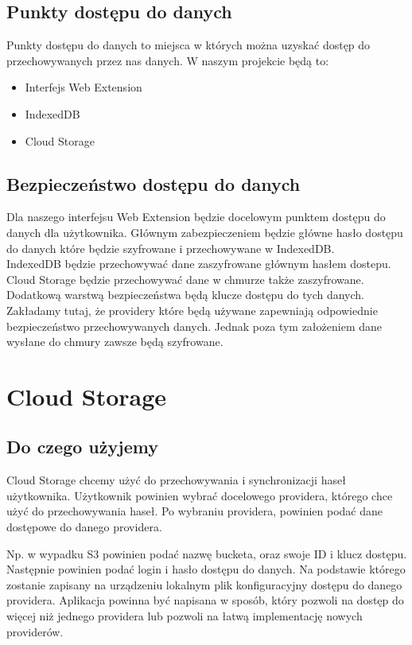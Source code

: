 \documentclass[11pt, a4paper]{article}
\begin{document}
\subsection{Punkty dostępu do danych}
Punkty dostępu do danych to miejsca w których można uzyskać dostęp do przechowywanych przez nas danych.
W naszym projekcie będą to:
\begin{itemize}
    \item Interfejs Web Extension
    \item IndexedDB
    \item Cloud Storage
\end{itemize}

\subsection{Bezpieczeństwo dostępu do danych}

Dla naszego interfejsu Web Extension będzie docelowym punktem dostępu do danych dla użytkownika. 
Głównym zabezpieczeniem będzie główne hasło dostępu do danych które będzie szyfrowane i przechowywane w IndexedDB.\\
IndexedDB będzie przechowywać dane zaszyfrowane głównym hasłem dostepu.\\
Cloud Storage będzie przechowywać dane w chmurze także zaszyfrowane. Dodatkową warstwą bezpieczeństwa będą klucze dostępu do tych danych.
Zakładamy tutaj, że providery które będą używane zapewniają odpowiednie bezpieczeństwo przechowywanych danych.
Jednak poza tym założeniem dane wysłane do chmury zawsze będą szyfrowane.

\section{Cloud Storage}
\subsection{Do czego użyjemy}
Cloud Storage chcemy użyć do przechowywania i synchronizacji haseł użytkownika.
Użytkownik powinien wybrać docelowego providera, którego chce użyć do przechowywania haseł.
Po wybraniu providera, powinien podać dane dostępowe do danego providera.

Np. w wypadku S3 powinien podać nazwę bucketa, oraz swoje ID i klucz dostępu.
Następnie powinien podać login i hasło dostępu do danych.
Na podstawie którego zostanie zapisany na urządzeniu lokalnym plik konfiguracyjny dostępu do danego providera.
Aplikacja powinna być napisana w sposób, który pozwoli na dostęp do więcej niż jednego providera lub pozwoli na łatwą implementację nowych providerów.
\end{document}

